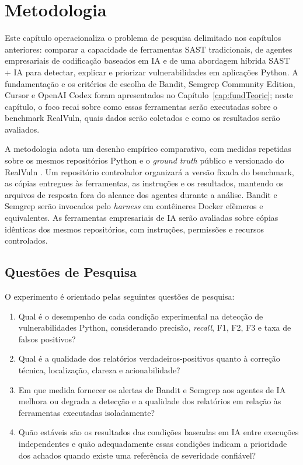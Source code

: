 \chapter{Metodologia}\label{cap:metodologia}

Este capítulo operacionaliza o problema de pesquisa delimitado nos capítulos anteriores: comparar a capacidade de ferramentas SAST tradicionais, de agentes empresariais de codificação baseados em IA e de uma abordagem híbrida SAST + IA para detectar, explicar e priorizar vulnerabilidades em aplicações Python. A fundamentação e os critérios de escolha de Bandit, Semgrep Community Edition, Cursor e OpenAI Codex foram apresentados no Capítulo~\ref{cap:fundTeoric}; neste capítulo, o foco recai sobre como essas ferramentas serão executadas sobre o benchmark RealVuln, quais dados serão coletados e como os resultados serão avaliados.

A metodologia adota um desenho empírico comparativo, com medidas repetidas sobre os mesmos repositórios Python e o \textit{ground truth} público e versionado do RealVuln \cite{Pellew2026RealVuln}. Um repositório controlador organizará a versão fixada do benchmark, as cópias entregues às ferramentas, as instruções e os resultados, mantendo os arquivos de resposta fora do alcance dos agentes durante a análise. Bandit e Semgrep serão invocados pelo \textit{harness} em contêineres Docker efêmeros e equivalentes. As ferramentas empresariais de IA serão avaliadas sobre cópias idênticas dos mesmos repositórios, com instruções, permissões e recursos controlados.

\section{Questões de Pesquisa}\label{sec:questoes-pesquisa-metodologia}

O experimento é orientado pelas seguintes questões de pesquisa:

\begin{enumerate}
\item[\textbf{QP1}] Qual é o desempenho de cada condição experimental na detecção de vulnerabilidades Python, considerando precisão, \textit{recall}, F1, F2, F3 e taxa de falsos positivos?
\item[\textbf{QP2}] Qual é a qualidade dos relatórios verdadeiros-positivos quanto à correção técnica, localização, clareza e acionabilidade?
\item[\textbf{QP3}] Em que medida fornecer os alertas de Bandit e Semgrep aos agentes de IA melhora ou degrada a detecção e a qualidade dos relatórios em relação às ferramentas executadas isoladamente?
\item[\textbf{QP4}] Quão estáveis são os resultados das condições baseadas em IA entre execuções independentes e quão adequadamente essas condições indicam a prioridade dos achados quando existe uma referência de severidade confiável?
\end{enumerate}

